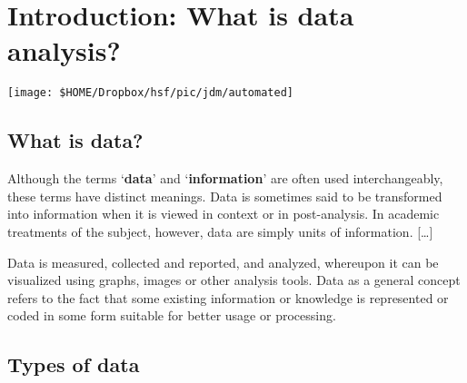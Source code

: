 
\chapter{Introduction: What is data analysis?}

\hfill	\texttt{[image: \$HOME/Dropbox/hsf/pic/jdm/automated]}




\section{What is data?}





Although the terms `\textbf{data}' and `\textbf{information}' are often used interchangeably, these terms have distinct meanings. Data is sometimes said to be transformed into information when it is viewed in context or in post-analysis. In academic treatments of the subject, however, data are simply units of information. [\dots]

Data is measured, collected and reported, and analyzed, whereupon it can be visualized using graphs, images or other analysis tools. Data as a general concept refers to the fact that some existing information or knowledge is represented or coded in some form suitable for better usage or processing. 





\section{Types of data}


